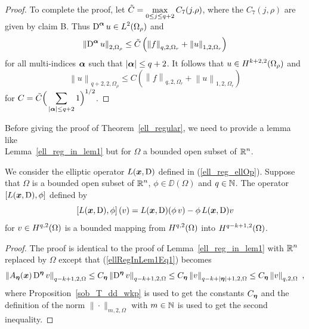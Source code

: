 \begin{proof}
 To complete the proof, let
$\displaystyle \tilde{C} = \max_{0\leq j \leq q+2} C_7(j.\rho)$, where the
$C_7(j,\rho)$ are given by claim B.  Thus
$\displaystyle \operatorname{D}^{{\bm{\alpha}}} u \in L^2(\Omega_\rho)$ and
\[
\left\|\operatorname{D}^{{\bm{\alpha}}} u \right\|_{2,\Omega_\rho} \leq \tilde{C} \left(
\left\|f\right\|_{q,2,\Omega_r} + \left\|u\right\|_{1,2,\Omega_r}
\right)
\]
for all multi-indices ${\bm{\alpha}}$ such that
$|{\bm{\alpha}}|\leq q+2$.  It follows
that $\displaystyle u \in H^{k+2,2}(\Omega_\rho)$ and
\[
\left\|u \right\|_{q+2,2,\Omega_\rho} \leq C \left(
\left\|f\right\|_{q,2,\Omega_r} + \left\|u\right\|_{1,2,\Omega_r}
\right)
\]
for $\displaystyle C = \tilde{C}
\Big(\sum_{|{\bm{\alpha}}|\leq q+2} 1\Big)^{1/2}$.
\end{proof}

Before giving the proof of Theorem~\ref{ell_regular}, we
need to provide a lemma like\\
Lemma~\ref{ell_reg_in_lem1} but for
$\Omega$ a bounded open subset of $\displaystyle \mathbb{R}^n$.

\begin{lemma} \label{ell_reg_out_lem1}
We consider the elliptic operator $L({\bm{x}},\operatorname{D})$ defined in
(\ref{ell_reg_ellOp}).  Suppose that $\Omega$ is a bounded open subset
of $\displaystyle \mathbb{R}^n$, $\phi \in \DD(\Omega)$ and $q\in \mathbb{N}$.
The operator $\left[ L({\bm{x}},\operatorname{D}), \phi\right]$ defined by
\[
\left[ L({\bm{x}},\operatorname{D}), \phi\right](v)
= L({\bm{x}},\operatorname{D}) (\phi\, v) - \phi\, L({\bm{x}},\operatorname{D}) v
\]
for $\displaystyle v \in \displaystyle H^{q,2}(\Omega)$ is a bounded
mapping from $\displaystyle H^{q,2}(\Omega)$ into
$\displaystyle H^{q-k+1,2}(\Omega)$.
\end{lemma}

\begin{proof}
The proof is identical to the proof of Lemma~\ref{ell_reg_in_lem1}
with $\displaystyle \mathbb{R}^n$ replaced by $\Omega$ except that
(\ref{ellRegInLem1Eq1}) becomes
\[
\left\| A_{{\bm{\eta}}}({\bm{x}}) \operatorname{D}^{{\bm{\eta}}} v \right\|_{q-k+1,2,\Omega}
\leq C_{{\bm{\eta}}} \left\| \operatorname{D}^{{\bm{\eta}}} v \right\|_{q-k+1,2,\Omega}
\leq C_{{\bm{\eta}}} \left\| v \right\|_{q-k+|{\bm{\eta}}|+1,2,\Omega}
\leq C_{{\bm{\eta}}} \left\| v \right\|_{q,2,\Omega} \ ,
\]
where Proposition~\ref{sob_T_dd_wkp} is used to get the constants
$C_{{\bm{\eta}}}$ and the definition of the norm $\|\cdot\|_{m,2,\Omega}$
with $m\in \mathbb{N}$ is used to get the second inequality.
\end{proof}


